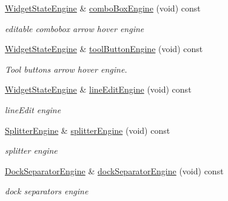 \begin{DoxyCompactItemize}
\mbox{\label{class_animations_a0593fea18819b605e8898cd8392938bc}} 
\hyperlink{class_widget_state_engine}{Widget\+State\+Engine} \& \hyperlink{class_animations_a0593fea18819b605e8898cd8392938bc}{combo\+Box\+Engine} (void) const
\begin{DoxyCompactList}\small\item\em editable combobox arrow hover engine \end{DoxyCompactList}\item 
\mbox{\label{class_animations_a96c5dc49952bd7f53015b2f46c0273bd}} 
\hyperlink{class_widget_state_engine}{Widget\+State\+Engine} \& \hyperlink{class_animations_a96c5dc49952bd7f53015b2f46c0273bd}{tool\+Button\+Engine} (void) const
\begin{DoxyCompactList}\small\item\em Tool buttons arrow hover engine. \end{DoxyCompactList}\item 
\mbox{\label{class_animations_a936691b489910f7e0d3d0609cd507c3d}} 
\hyperlink{class_widget_state_engine}{Widget\+State\+Engine} \& \hyperlink{class_animations_a936691b489910f7e0d3d0609cd507c3d}{line\+Edit\+Engine} (void) const
\begin{DoxyCompactList}\small\item\em line\+Edit engine \end{DoxyCompactList}\item 
\mbox{\label{class_animations_ace5cf8f47e527e234a1775195716bf44}} 
\hyperlink{class_splitter_engine}{Splitter\+Engine} \& \hyperlink{class_animations_ace5cf8f47e527e234a1775195716bf44}{splitter\+Engine} (void) const
\begin{DoxyCompactList}\small\item\em splitter engine \end{DoxyCompactList}\item 
\mbox{\label{class_animations_a74cfa837c6274c98b289d258d850f9c1}} 
\hyperlink{class_dock_separator_engine}{Dock\+Separator\+Engine} \& \hyperlink{class_animations_a74cfa837c6274c98b289d258d850f9c1}{dock\+Separator\+Engine} (void) const
\begin{DoxyCompactList}\small\item\em dock separators engine \end{DoxyCompactList}\item 

\end{DoxyCompactItemize}

